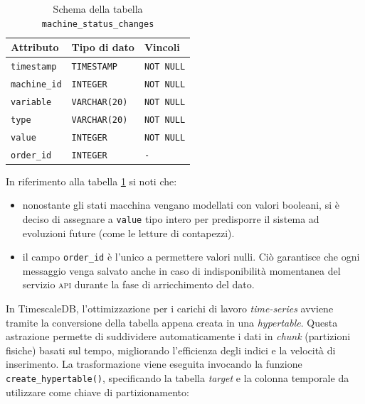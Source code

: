 \documentclass[12pt]{article}
\begin{document}
    \begin{table}[htbp]
        \centering
        \caption{Schema della tabella \texttt{machine\_status\_changes}}
        \label{tab:schema_database}
        \begin{tabular}{lll}
            \hline
            \textbf{Attributo} & \textbf{Tipo di dato} & \textbf{Vincoli} \\ \hline
            \verb|timestamp|   & \verb|TIMESTAMP|   & \verb|NOT NULL| \\
            \verb|machine_id|  & \verb|INTEGER|       & \verb|NOT NULL| \\
            \verb|variable|    & \verb|VARCHAR(20)|   & \verb|NOT NULL| \\
            \verb|type|        & \verb|VARCHAR(20)|   & \verb|NOT NULL| \\
            \verb|value|       & \verb|INTEGER|       & \verb|NOT NULL| \\
            \verb|order_id|    & \verb|INTEGER|       & \verb|-| \\ \hline
        \end{tabular}
    \end{table}
    
    
    In riferimento alla tabella \ref{tab:schema_database} si noti che:
    \begin{itemize}
        \item nonostante gli stati macchina vengano modellati con valori booleani, si è deciso di assegnare a \verb|value| tipo intero per predisporre il sistema ad evoluzioni future (come le letture di contapezzi).
        \item il campo \verb|order_id| è l'unico a permettere valori nulli. Ciò garantisce che ogni messaggio venga salvato anche in caso di indisponibilità momentanea del servizio \textsc{api} durante la fase di arricchimento del dato.
    \end{itemize}

    In TimescaleDB, l'ottimizzazione per i carichi di lavoro \textit{time-series} avviene tramite la conversione della tabella appena creata in una \textit{hypertable}. Questa astrazione permette di suddividere automaticamente i dati in \textit{chunk} (partizioni fisiche) basati sul tempo, migliorando l'efficienza degli indici e la velocità di inserimento. La trasformazione viene eseguita invocando la funzione \verb|create_hypertable()|, specificando la tabella \textit{target} e la colonna temporale da utilizzare come chiave di partizionamento:
    
\end{document}
